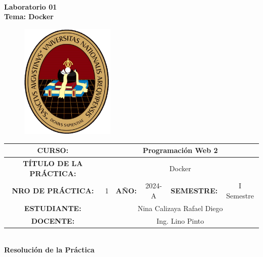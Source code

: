 \documentclass{article}
\begin{document}


\begin{center}
	\Huge \textbf{\\  \Large Laboratorio 01 \\ \Large Tema: Docker}
\end{center}


\begin{figure}[htbp]
  \centering
  \includegraphics[width=0.4\textwidth]{img/logoUnsa.png}
\end{figure}


\noindent
\renewcommand{\arraystretch}{2}
\begin{table}[h]
\centering
\begin{tabular}{|c|c|c|c|c|c||}
\hline
\multicolumn{1}{|c|}{\textbf{\scriptsize CURSO:}} & \multicolumn{5}{|c|}{\small Programación Web 2} \\ \hline
\multicolumn{1}{|c|}{\textbf{\scriptsize TÍTULO DE LA PRÁCTICA:}} & \multicolumn{5}{|c|}{\small Docker} \\ \hline
\multicolumn{1}{|c|}{\textbf{\scriptsize NRO DE PRÁCTICA:}} & \multicolumn{1}{|c|}{\small 1}& \multicolumn{1}{|c|}{\textbf{\footnotesize AÑO:}} & \multicolumn{1}{|c|}{\small 2024-A} & \multicolumn{1}{|c|}{\textbf{\footnotesize SEMESTRE:}} & \multicolumn{1}{|c|}{\small I Semestre} \\ \hline \multicolumn{1}{|c|}{\textbf{\scriptsize ESTUDIANTE:}} & \multicolumn{5}{|c|}{\small Nina Calizaya Rafael Diego} \\ \hline  \multicolumn{1}{|c|}{\textbf{\scriptsize DOCENTE:}} & \multicolumn{5}{|c|}{\small Ing. Lino Pinto} \\ \hline
\end{tabular}
\end{table}

\clearpage
\begin{center}
	\Huge \textbf{\\ \Large Resolución de la Práctica \\}
\end{center}
\end{document}
